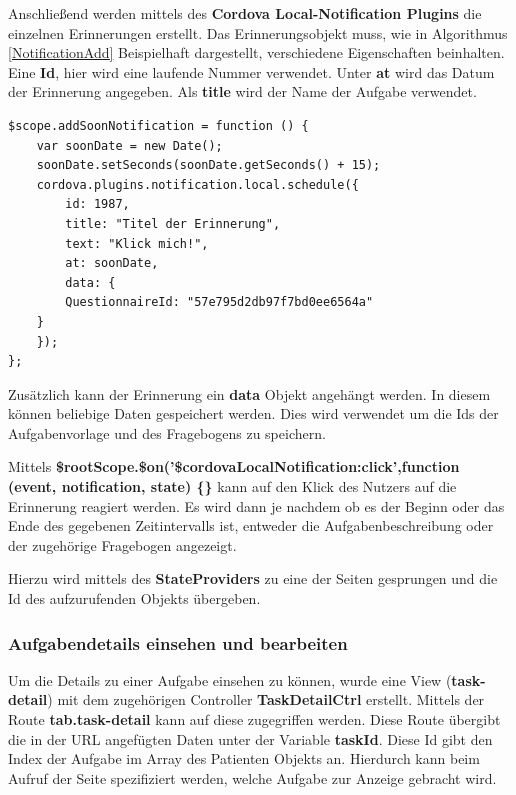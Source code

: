 Anschließend werden mittels des \textbf{Cordova Local-Notification Plugins} die einzelnen Erinnerungen erstellt. Das Erinnerungsobjekt muss, wie in Algorithmus \ref{NotificationAdd} Beispielhaft dargestellt, verschiedene Eigenschaften beinhalten. Eine \textbf{Id}, hier wird eine laufende Nummer verwendet. Unter \textbf{at} wird das Datum der Erinnerung angegeben.
Als \textbf{title} wird der Name der Aufgabe verwendet.

\begin{lstlisting}[float=htbp, caption={Beispiel einer Funktion zum hinzufügen einer Betriebssystemerinnerung},label=NotificationAdd]
$scope.addSoonNotification = function () {
	var soonDate = new Date();
	soonDate.setSeconds(soonDate.getSeconds() + 15);
	cordova.plugins.notification.local.schedule({
		id: 1987,
		title: "Titel der Erinnerung",
		text: "Klick mich!",
		at: soonDate,
		data: {
		QuestionnaireId: "57e795d2db97f7bd0ee6564a"
	}
	});
};
\end{lstlisting}

Zusätzlich kann der Erinnerung  ein \textbf{data} Objekt angehängt werden. In diesem können beliebige Daten gespeichert werden. Dies wird verwendet um die Ids der Aufgabenvorlage und des Fragebogens zu speichern. 

Mittels \textbf{\$rootScope.\$on('\$cordovaLocalNotification:click',function (event, notification, state) \{\}} kann auf den Klick des Nutzers auf die Erinnerung reagiert werden. Es wird dann je nachdem ob es der Beginn oder das Ende des gegebenen Zeitintervalls ist, entweder die Aufgabenbeschreibung oder der zugehörige Fragebogen angezeigt.

Hierzu wird mittels des \textbf{StateProviders} zu eine der Seiten gesprungen und die Id des aufzurufenden Objekts übergeben.
\newpage
\subsubsection{Aufgabendetails einsehen und bearbeiten}\label{_ImpPCAufgabenDetail}
Um die Details zu einer Aufgabe einsehen zu können, wurde eine View (\textbf{task-detail}) mit dem zugehörigen Controller \textbf{TaskDetailCtrl} erstellt. Mittels der Route \textbf{tab.task-detail} kann auf diese zugegriffen werden. Diese Route übergibt die in der URL angefügten Daten unter der Variable \textbf{taskId}. Diese Id gibt den Index der Aufgabe im Array des Patienten Objekts an. Hierdurch kann beim Aufruf der Seite spezifiziert werden, welche Aufgabe zur Anzeige gebracht wird.

